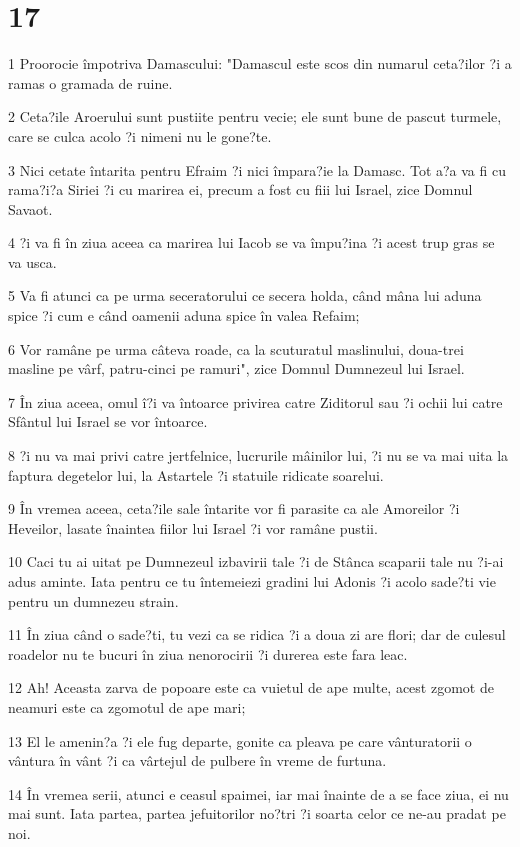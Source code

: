 \chapter{17}

\par 1 Proorocie împotriva Damascului: "Damascul este scos din numarul ceta?ilor ?i a ramas o gramada de ruine.
\par 2 Ceta?ile Aroerului sunt pustiite pentru vecie; ele sunt bune de pascut turmele, care se culca acolo ?i nimeni nu le gone?te.
\par 3 Nici cetate întarita pentru Efraim ?i nici împara?ie la Damasc. Tot a?a va fi cu rama?i?a Siriei ?i cu marirea ei, precum a fost cu fiii lui Israel, zice Domnul Savaot.
\par 4 ?i va fi în ziua aceea ca marirea lui Iacob se va împu?ina ?i acest trup gras se va usca.
\par 5 Va fi atunci ca pe urma seceratorului ce secera holda, când mâna lui aduna spice ?i cum e când oamenii aduna spice în valea Refaim;
\par 6 Vor ramâne pe urma câteva roade, ca la scuturatul maslinului, doua-trei masline pe vârf, patru-cinci pe ramuri", zice Domnul Dumnezeul lui Israel.
\par 7 În ziua aceea, omul î?i va întoarce privirea catre Ziditorul sau ?i ochii lui catre Sfântul lui Israel se vor întoarce.
\par 8 ?i nu va mai privi catre jertfelnice, lucrurile mâinilor lui, ?i nu se va mai uita la faptura degetelor lui, la Astartele ?i statuile ridicate soarelui.
\par 9 În vremea aceea, ceta?ile sale întarite vor fi parasite ca ale Amoreilor ?i Heveilor, lasate înaintea fiilor lui Israel ?i vor ramâne pustii.
\par 10 Caci tu ai uitat pe Dumnezeul izbavirii tale ?i de Stânca scaparii tale nu ?i-ai adus aminte. Iata pentru ce tu întemeiezi gradini lui Adonis ?i acolo sade?ti vie pentru un dumnezeu strain.
\par 11 În ziua când o sade?ti, tu vezi ca se ridica ?i a doua zi are flori; dar de culesul roadelor nu te bucuri în ziua nenorocirii ?i durerea este fara leac.
\par 12 Ah! Aceasta zarva de popoare este ca vuietul de ape multe, acest zgomot de neamuri este ca zgomotul de ape mari;
\par 13 El le amenin?a ?i ele fug departe, gonite ca pleava pe care vânturatorii o vântura în vânt ?i ca vârtejul de pulbere în vreme de furtuna.
\par 14 În vremea serii, atunci e ceasul spaimei, iar mai înainte de a se face ziua, ei nu mai sunt. Iata partea, partea jefuitorilor no?tri ?i soarta celor ce ne-au pradat pe noi.

